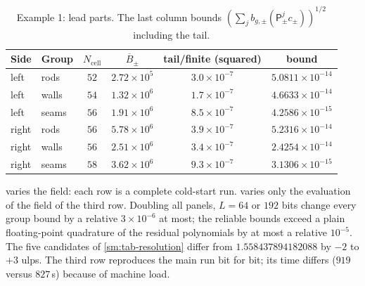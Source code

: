 \begin{table}[tbhp]
\caption{Example 1: lead parts. The last column bounds
$(\sum_jb_{g,\pm}(\mathsf P_\pm^jc_\pm))^{1/2}$ including the tail.}
\label{sm:tab-tails}
\centering\small
\begin{tabular}{llcccc}
\toprule
Side & Group & $N_{\mathrm{cell}}$ & $\overline B_\pm$ & tail/finite (squared) & bound\\
\midrule
left & rods & $52$ & $2.72\times10^{5}$ & $3.0\times10^{-7}$ & $5.0811\times10^{-14}$\\
left & walls & $54$ & $1.32\times10^{6}$ & $1.7\times10^{-7}$ & $4.6633\times10^{-14}$\\
left & seams & $56$ & $1.91\times10^{6}$ & $8.5\times10^{-7}$ & $4.2586\times10^{-15}$\\
right & rods & $56$ & $5.78\times10^{6}$ & $3.9\times10^{-7}$ & $5.2316\times10^{-14}$\\
right & walls & $56$ & $2.51\times10^{6}$ & $3.4\times10^{-7}$ & $2.4254\times10^{-14}$\\
right & seams & $58$ & $3.62\times10^{6}$ & $9.3\times10^{-7}$ & $3.1306\times10^{-15}$\\
\bottomrule
\end{tabular}
\end{table}

 varies the field: each row is a complete cold-start run.
 varies only the evaluation of the field of the third row.
Doubling all panels, $L=64$ or $192$ bits change every group bound by a relative
$3\times10^{-6}$ at most; the reliable bounds exceed a plain floating-point
quadrature of the residual polynomials by at most a relative $10^{-5}$. The five
candidates of \cref{sm:tab-resolution} differ from $1.558437894182088$ by $-2$ to
$+3$ ulps. The third row reproduces the main run bit for bit; its time differs
($919$ versus $827$\,s) because of machine load.

